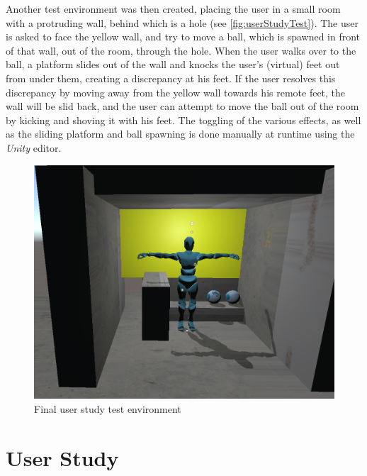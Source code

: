 Another test environment was then created, placing the user in a small room with a protruding wall, behind which is a hole (see \autoref{fig:userStudyTest}). The user is asked to face the yellow wall, and try to move a ball, which is spawned in front of that wall, out of the room, through the hole. When the user walks over to the ball, a platform slides out of the wall and knocks the user's (virtual) feet out from under them, creating a discrepancy at his feet. If the user resolves this discrepancy by moving away from the yellow wall towards his remote feet, the wall will be slid back, and the user can attempt to move the ball out of the room by kicking and shoving it with his feet.
\newline
The toggling of the various effects, as well as the sliding platform and ball spawning is done manually at runtime using the \textit{Unity} editor.
\begin{figure}[h]
    \centering
    \includegraphics[height=0.3\textheight]{figures/UserStudyBallRoom}
    \caption{Final user study test environment}
    \label{fig:userStudyTest}
\end{figure}


\section{User Study}

